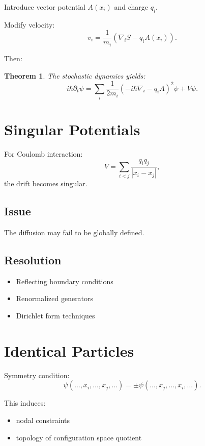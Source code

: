 \documentclass[11pt]{article}
\newtheorem{theorem}{Theorem}
\begin{document}
Introduce vector potential $A(x_i)$ and charge $q_i$.

Modify velocity:
\begin{equation}
v_i = \frac{1}{m_i}(\nabla_i S - q_i A(x_i)).
\end{equation}

Then:
\begin{theorem}
The stochastic dynamics yields:
\begin{equation}
i\hbar \partial_t \psi =
\sum_i \frac{1}{2m_i}(-i\hbar\nabla_i - q_i A)^2 \psi + V\psi.
\end{equation}
\end{theorem}

\section{Singular Potentials}

For Coulomb interaction:
\begin{equation}
V = \sum_{i<j} \frac{q_i q_j}{|x_i - x_j|},
\end{equation}
the drift becomes singular.

\subsection{Issue}
The diffusion may fail to be globally defined.

\subsection{Resolution}
\begin{itemize}
\item Reflecting boundary conditions
\item Renormalized generators
\item Dirichlet form techniques
\end{itemize}

\section{Identical Particles}

Symmetry condition:
\begin{equation}
\psi(\dots,x_i,\dots,x_j,\dots) = \pm \psi(\dots,x_j,\dots,x_i,\dots).
\end{equation}

This induces:
\begin{itemize}
\item nodal constraints
\item topology of configuration space quotient
\end{itemize}
\end{document}
